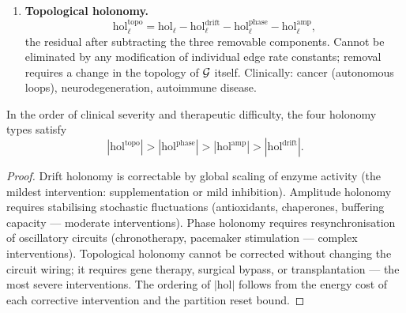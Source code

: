 \begin{enumerate}[label=(\arabic*), itemsep=4pt]
  \item \textbf{Topological holonomy.}
        \begin{equation}
          \mathrm{hol}_{\ell}^{\mathrm{topo}}
          = \mathrm{hol}_\ell
            - \mathrm{hol}_{\ell}^{\mathrm{drift}}
            - \mathrm{hol}_{\ell}^{\mathrm{phase}}
            - \mathrm{hol}_{\ell}^{\mathrm{amp}},
          \label{eq:topo-hol}
        \end{equation}
        the residual after subtracting the three removable components.
        Cannot be eliminated by any modification of individual edge
        rate constants; removal requires a change in the topology of
        $\mathcal{G}$ itself.  Clinically: cancer (autonomous loops),
        neurodegeneration, autoimmune disease.
\end{enumerate}

\begin{proposition}
\label{prop:severity}
In the order of clinical severity and therapeutic difficulty, the four
holonomy types satisfy
\begin{equation}
  |\mathrm{hol}^{\mathrm{topo}}|
  > |\mathrm{hol}^{\mathrm{phase}}|
  > |\mathrm{hol}^{\mathrm{amp}}|
  > |\mathrm{hol}^{\mathrm{drift}}|.
  \label{eq:severity-hierarchy}
\end{equation}
\end{proposition}

\begin{proof}
Drift holonomy is correctable by global scaling of enzyme activity (the
mildest intervention: supplementation or mild inhibition).  Amplitude
holonomy requires stabilising stochastic fluctuations (antioxidants,
chaperones, buffering capacity --- moderate interventions).  Phase holonomy
requires resynchronisation of oscillatory circuits (chronotherapy, pacemaker
stimulation --- complex interventions).  Topological holonomy cannot be
corrected without changing the circuit wiring; it requires gene therapy,
surgical bypass, or transplantation --- the most severe interventions.
The ordering of $|\mathrm{hol}|$ follows from the energy cost of each
corrective intervention and the partition reset bound.
\end{proof}

